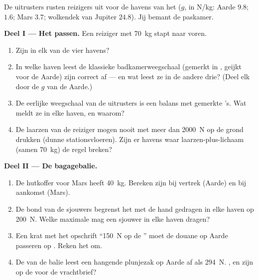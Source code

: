 \begin{problem}\label{pb:g9:weight-vs-mass:1}
De uitrusters rusten reizigers uit voor de havens van het
 ($g$, in \unit{N/kg}: Aarde $9.8$;
 $1.6$; Mars $3.7$; wolkendek van Jupiter $24.8$). Jij
bemant de paskamer.

\medskip\noindent\textbf{Deel I --- Het passen.}
Een reiziger met  \qty{70}{kg} stapt naar voren.
\begin{enumerate}
  \item Zijn  in elk van de vier havens?
  \item In welke haven leest de klassieke badkamerweegschaal (gemerkt
        in , geijkt voor de Aarde) zijn
         correct af --- en wat leest ze in de andere drie?
        (Deel elk  door de $g$ van de Aarde.)
  \item De eerlijke weegschaal van de uitrusters is een balans met
        gemerkte 's. Wat meldt ze in elke haven, en waarom?
  \item De laarzen van de reiziger mogen nooit met meer dan
        \qty{2000}{N} op de grond drukken (dunne stationsvloeren).
        Zijn er havens waar laarzen-plus-lichaam (samen \qty{70}{kg})
        de regel breken?
\end{enumerate}

\medskip\noindent\textbf{Deel II --- De bagagebalie.}
\begin{enumerate}[resume]
  \item De hutkoffer voor Mars heeft  \qty{40}{kg}. Bereken
        zijn  bij vertrek (Aarde) en bij aankomst (Mars).
  \item De bond van de sjouwers begrenst het met de hand gedragen
        \emph{} in elke haven op \qty{200}{N}. Welke
        maximale \emph{} mag een sjouwer in elke haven
        dragen?
  \item Een krat met het opschrift ``\qty{150}{N} op de
        '' moet de douane op Aarde passeren op
        . Reken het om.
  \item De  van de balie leest een hangende plunjezak
        op Aarde af als \qty{294}{N}. , en zijn
         op de  voor de vrachtbrief?
\end{enumerate}


\end{problem}
